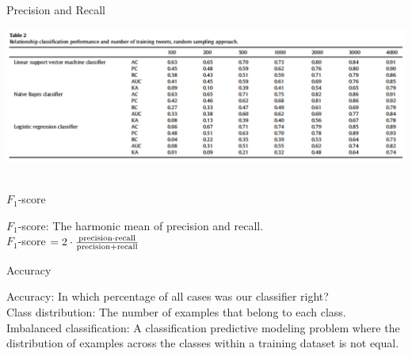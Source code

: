 \documentclass[handout]{beamer}
\begin{document}
\begin{frame}{Precision and Recall}
	
	\begin{center}
		\includegraphics[width=\linewidth,height=\textheight,keepaspectratio]{../pictures/VanZoonen.png} \\\
	\end{center}
	
	\begin{tiny}
	\end{tiny}
	
	
	
	
\end{frame}


\begin{frame}{\(F_1\)-score}
	
	\(F_1\)-score: The harmonic mean of precision and recall. \\
	
	\(F_1\)-score \(= 2 \cdot \frac{\rm precision \cdot recall}{\rm precision + recall}\)
	
	
	
\end{frame}



\begin{frame}{Accuracy}
	
	Accuracy: In which percentage of all cases was our classifier right? \\
	
	Class distribution: The number of examples that belong to each class. \\
	
	Imbalanced classification: A classification predictive modeling problem where the distribution of examples across the classes within a training dataset is not equal.
	
	
\end{frame}
\end{document}

